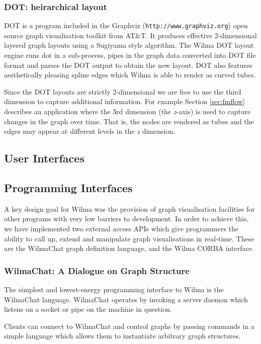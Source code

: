 \documentclass[runningheads]{cl2emult}
\newcommand{\url}[1]{{\small{\tt #1}}}
\begin{document}
\subsubsection{DOT: heirarchical layout}
DOT is a program included in the Graphviz
(\url{http://www.graphviz.org}) open source graph visualisation
toolkit from AT\&T.  It produces effective 2-dimensional layered graph
layouts using a Sugiyama\cite{Sugiyama81methods} style algorithm.
The Wilma DOT layout engine runs dot in a sub-process, pipes in the graph
data converted into DOT file format and parses the DOT output to
obtain the new layout.
DOT also features aesthetically pleasing spline edges which Wilma
is able to render as curved tubes.

Since the DOT layouts are strictly 2-dimensional we are free to use the
third dimension to capture additional information.  For example
Section \ref{sec:fmflow} describes an application where the 3rd
dimension (the {\em z}-axis) is used to capture changes in the graph over time.
That is, the nodes are rendered as tubes and the edges may appear at different
levels in the {\em z} dimension.

\subsection{User Interfaces}
\subsection{Programming Interfaces}
\label{API}

A key design goal for Wilma was the provision of graph visualisation
facilities for other programs with very low barriers to development.  In order
to achieve this, we have implemented two external access APIs which give
programmers the ability to call up, extend and manipulate graph visualisations
in real-time.  These are the WilmaChat graph definition language, and the
Wilma CORBA interface.

\subsubsection{WilmaChat: A Dialogue on Graph Structure}

The simplest and lowest-energy programming interface to Wilma is the WilmaChat
language.  WilmaChat operates by invoking a server daemon which listens on a
socket or pipe on the machine in question.

Clients can connect to WilmaChat and control graphs by passing commands
in a simple language which allows them to instantiate arbitrary graph
structures.
\end{document}
